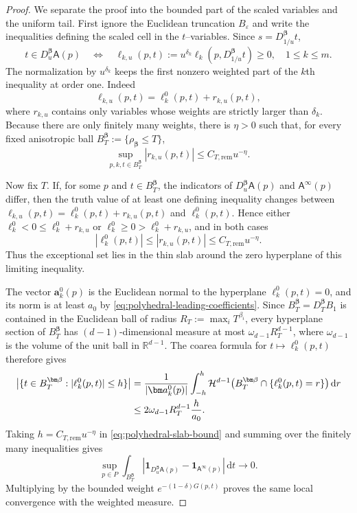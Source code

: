 \documentclass[11pt]{amsart}
\numberwithin{equation}{section}
\theoremstyle{definition}
\theoremstyle{remark}
\newcommand{\R}{\mathbb{R}}
\newcommand{\ind}{\mathbf{1}}
\newcommand{\dd}{\,\mathrm{d}}
\newcommand{\eps}{\varepsilon}
\newcommand{\Afib}{\mathsf{A}}
\begin{document}
\begin{proof}
We separate the proof into the bounded part of the scaled variables and the
uniform tail.  First ignore the Euclidean truncation $B_\eps$ and write the
inequalities defining the scaled cell in the $t$--variables.  Since
$s=D_{1/u}^{\bm\beta}t$,
\[
 t\in D_u^{\bm\beta}\Afib(p)
 \quad\Longleftrightarrow\quad
 \ell_{k,u}(p,t):=u^{\delta_k}\ell_k(p,D_{1/u}^{\bm\beta}t)\ge0,
 \quad 1\le k\le m.
\]
The normalization by $u^{\delta_k}$ keeps the first nonzero weighted part of
the $k$th inequality at order one.  Indeed
\[
 \ell_{k,u}(p,t)=\ell_k^0(p,t)+r_{k,u}(p,t),
\]
where $r_{k,u}$ contains only variables whose weights are strictly larger than
$\delta_k$.  Because there are only finitely many weights, there is
$\eta>0$ such that, for every fixed anisotropic ball
$B_T^{\bm\beta}:=\{\rho_{\bm\beta}\le T\}$,
\begin{equation}\label{eq:polyhedral-remainder}
 \sup_{p,k,t\in B_T^{\bm\beta}}|r_{k,u}(p,t)|
 \le C_{T,\mathrm{rem}}u^{-\eta}.
\end{equation}

Now fix $T$.  If, for some $p$ and $t\in B_T^{\bm\beta}$, the indicators of
$D_u^{\bm\beta}\Afib(p)$ and $\Afib^\infty(p)$ differ, then the truth value of
at least one defining inequality changes between
$\ell_{k,u}(p,t)=\ell_k^0(p,t)+r_{k,u}(p,t)$ and $\ell_k^0(p,t)$.  Hence either
$\ell_k^0<0\le \ell_k^0+r_{k,u}$ or
$\ell_k^0\ge0>\ell_k^0+r_{k,u}$, and in both cases
\[
 |\ell_k^0(p,t)|\le |r_{k,u}(p,t)|
 \le C_{T,\mathrm{rem}}u^{-\eta}.
\]
Thus the exceptional set lies in the thin slab around the zero hyperplane of
this limiting inequality.

The vector $\bm a_k^0(p)$ is the Euclidean normal to the hyperplane
$\ell_k^0(p,t)=0$, and its norm is at least $a_0$ by
\eqref{eq:polyhedral-leading-coefficients}.  Since
$B_T^{\bm\beta}=D_T^{\bm\beta}B_1$ is contained in the Euclidean ball of
radius $R_T:=\max_iT^{\beta_i}$, every hyperplane section of
$B_T^{\bm\beta}$ has $(d-1)$-dimensional measure at most
$\omega_{d-1}R_T^{d-1}$, where $\omega_{d-1}$ is the volume of the unit ball
in $\R^{d-1}$.  The coarea formula for
$t\mapsto\ell_k^0(p,t)$ therefore gives
\begin{align}
 \bigl|\{t\in B_T^{\bm\beta}:|\ell_k^0(p,t)|\le h\}\bigr|
 &=\frac1{|\bm a_k^0(p)|}\int_{-h}^{h}
   \mathcal H^{d-1}
   \bigl(B_T^{\bm\beta}\cap\{\ell_k^0(p,t)=r\}\bigr)\dd r\notag\\
 &\le 2\omega_{d-1}R_T^{d-1}\frac{h}{a_0}.
 \label{eq:polyhedral-slab-bound}
\end{align}
Taking $h=C_{T,\mathrm{rem}}u^{-\eta}$ in
\eqref{eq:polyhedral-slab-bound} and summing over the finitely many
inequalities gives
\[
 \sup_{p\in P}\int_{B_T^{\bm\beta}}
 \left|\ind_{D_u^{\bm\beta}\Afib(p)}-
       \ind_{\Afib^\infty(p)}\right|\dd t\longrightarrow0.
\]
Multiplying by the bounded weight $e^{-(1-\delta)G(p,t)}$ proves the same
local convergence with the weighted measure.


\end{proof}
\end{document}
